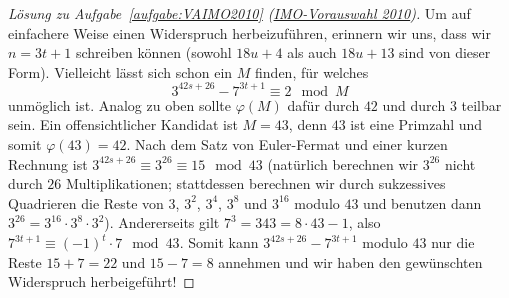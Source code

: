 \begin{proof}[Lösung zu Aufgabe~\ref{aufgabe:VAIMO2010} \textmd{(\href{https://www.mathe-wettbewerbe.de/fileadmin/Mathe-Wettbewerbe/AIMO/Aufgaben_und_Loesungen_AIMO/aufgaben_awb_10.pdf}{IMO-Vorauswahl 2010})}]
	Um auf einfachere Weise einen Widerspruch herbeizuführen, erinnern wir uns, dass wir $n=3t+1$ schreiben können (sowohl $18u+4$ als auch $18u+13$ sind von dieser Form). Vielleicht lässt sich schon ein $M$ finden, für welches
	\begin{equation*}
		3^{42s+26}-7^{3t+1}\equiv 2\mod M
	\end{equation*}
	unmöglich ist. Analog zu oben sollte $\varphi(M)$ dafür durch $42$ und durch $3$ teilbar sein. Ein offensichtlicher Kandidat ist $M=43$, denn $43$ ist eine Primzahl und somit $\varphi(43)=42$. Nach dem Satz von Euler-Fermat und einer kurzen Rechnung ist $3^{42s+26}\equiv 3^{26}\equiv 15\mod 43$ (natürlich berechnen wir $3^{26}$ nicht durch $26$ Multiplikationen; stattdessen berechnen wir durch sukzessives Quadrieren die Reste von $3$, $3^2$, $3^4$, $3^8$ und $3^{16}$ modulo $43$ und benutzen dann $3^{26}=3^{16}\cdot 3^8\cdot 3^2$). Andererseits gilt $7^3=343=8\cdot 43-1$, also $7^{3t+1}\equiv (-1)^t\cdot 7\mod 43$. Somit kann $3^{42s+26}-7^{3t+1}$ modulo $43$ nur die Reste $15+7=22$ und $15-7=8$ annehmen und wir haben den gewünschten Widerspruch herbeigeführt!
\end{proof}